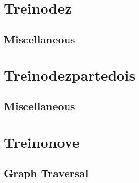 \section{Treinodez}
\subsection{Miscellaneous}
\raggedbottom
\vspace{-.7\baselineskip}\hrulefill
\vspace{0.1\baselineskip}
\section{Treinodezpartedois}
\subsection{Miscellaneous}
\raggedbottom
\vspace{-.7\baselineskip}\hrulefill
\vspace{0.1\baselineskip}
\section{Treinonove}
\subsection{Graph Traversal}
\raggedbottom
\vspace{-.7\baselineskip}\hrulefill
\vspace{0.1\baselineskip}
